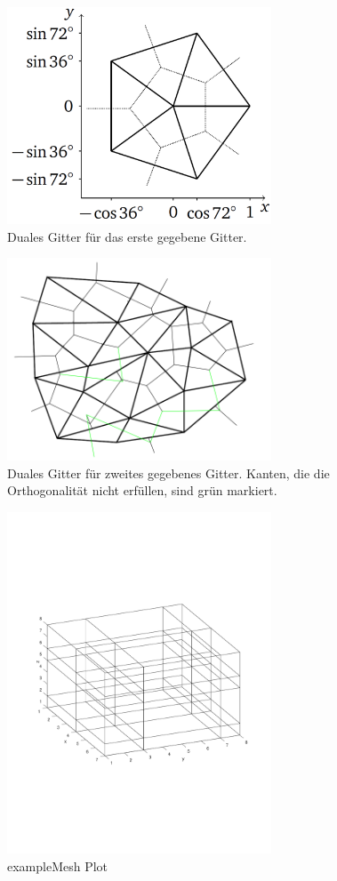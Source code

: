 \documentclass[Protokollheft.tex]{subfiles}
\begin{document}
\begin{figure}[h]
	\centering
	\includegraphics[width=0.7\textwidth]{Duales_Gitter_1.pdf}
	\caption{Duales Gitter für das erste gegebene Gitter.}
	\label{Abb:dual_1}
\end{figure}
\begin{figure}[h]
	\centering
	\includegraphics[width=0.7\textwidth]{Duales_Gitter_2.png}
	\caption{Duales Gitter für zweites gegebenes Gitter. Kanten, die die Orthogonalität nicht erfüllen, sind grün markiert.}
	\label{Abb:dual_2}
\end{figure}
\begin{figure}[h]
	\centering
	\includegraphics[trim = 15mm 65mm 15mm 60mm, clip,width=0.7\textwidth]{exmesh.pdf}
	\caption{exampleMesh Plot}
	\label{abb:example}
\end{figure}
\end{document}
